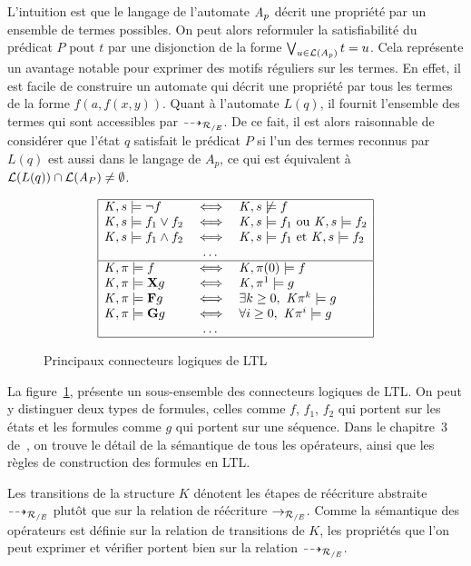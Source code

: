 L'intuition est que le langage de l'automate $\mathit A_p$ décrit une propriété par un ensemble de termes possibles.
On peut alors reformuler la satisfiabilité du prédicat $P$ pout $t$ par une disjonction de la forme 
$\bigvee_{u \in \mathcal{L}(A_p)} t = u$.
Cela représente un avantage notable pour exprimer des motifs réguliers sur les termes. En effet, il est facile 
de construire un automate qui décrit une propriété par tous les termes de la forme $f(a, f(x, y))$.
Quant à l'automate $L(q)$, il fournit l'ensemble des termes qui sont accessibles par $\dashrightarrow_{\mathcal R_{/E}}$.
De ce fait, il est alors raisonnable de considérer que l'état $q$ satisfait le prédicat $P$ si l'un des termes reconnus par $L(q)$ est aussi
dans le langage de $A_p$, ce qui est équivalent à $\mathcal{L}{}(L(q)) \cap \mathcal{L}{}(\mathit A_P) \neq \emptyset$.
\begin{figure}[ht!]
  \centering
  \[\begin{array}{|lcl|}
    \hline
    \mathit K, s \models \neg f & \; \Longleftrightarrow \; &  \mathit K, s \not\models f\\
    \mathit K, s \models f_1 \lor f_2 & \; \Longleftrightarrow \; & \mathit K, s \models f_1 \textrm{ ou } \mathit K, s \models f_2\\
    \mathit K, s \models f_1 \land f_2 & \; \Longleftrightarrow \; & \mathit K, s \models f_1 \textrm{ et } \mathit K, s \models f_2\\
    &\dots&\\
    \hline
    \mathit K, \pi \models f & \; \Longleftrightarrow \; & \mathit K, \pi(0) \models f\\
    \mathit K, \pi \models \mathbf X g & \; \Longleftrightarrow \; & \mathit K, \pi^1 \models g\\
    \mathit K, \pi \models \mathbf F g & \; \Longleftrightarrow \; & \exists k \ge 0,\ \mathit K \pi^k \models g \\
    \mathit K, \pi \models \mathbf G g & \; \Longleftrightarrow \; & \forall i \ge 0,\ \mathit K \pi^i \models g \\
    &\dots&\\
    \hline
  \end{array}\]
  \caption{Principaux connecteurs logiques de LTL}
  \label{fig:operateursLTL}
\end{figure}
La figure~\ref{fig:operateursLTL}, présente un sous-ensemble des
connecteurs logiques de LTL. On peut y distinguer deux types de
formules, celles comme $f$, $f_1$, $f_2$ qui portent sur les états
et les formules comme $g$ qui portent sur une séquence.  Dans le chapitre~3
de~\cite{MC-Book}, on trouve le détail de la sémantique de tous les
opérateurs, ainsi que les règles de construction des formules en LTL.


Les transitions de la structure $K$ dénotent les étapes de réécriture abstraite $\dashrightarrow_{{\mathcal R_{/E}}}$
plutôt que sur la relation de réécriture $\rightarrow_{\mathcal R_{/E}}$. Comme la sémantique des opérateurs est définie
sur la relation de transitions de $K$, les propriétés que l'on peut exprimer et vérifier portent bien
sur la relation $\dashrightarrow_{\mathcal R_{/E}}$.

